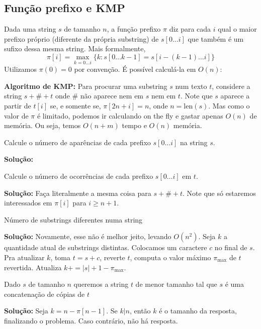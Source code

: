 \subsection{Função prefixo e KMP}

Dada uma string $s$ de tamanho $n$, a função prefixo $\pi$ diz para cada $i$ qual o maior prefixo próprio (diferente da própria substring) de $s[0...i]$ que também é um sufixo dessa mesma string. Mais formalmente,
$$\pi[i] = \max\limits_{k=0 \dots i} \{k : s[0 \dots k-1] = s[i - (k-1) \dots i] \}$$
Utilizamos $\pi(0) = 0$ por convenção. É possível calculá-la em $O(n)$:


\textbf{Algoritmo de KMP:} Para procurar uma substring $s$ num texto $t$, considere a string $s + \# + t$ onde $\#$ não aparece nem em $s$ nem em $t$. Note que $s$ aparece a partir de $t[i]$ se, e somente se, $\pi[2n+i] = n$, onde $n = \text{len}(s)$. Mas como o valor de $\pi$ é limitado, podemos ir calculando on the fly e gastar apenas $O(n)$ de memória. Ou seja, temos $O(n+m)$ tempo e $O(n)$ memória.

 Calcule o número de aparências de cada prefixo $s[0 \dots i]$ na string $s$.

\textbf{Solução:}


 Calcule o número de ocorrências de cada prefixo $s[0 \dots i]$ em $t$.

\textbf{Solução:} Faça literalmente a mesma coisa para $s + \# + t$. Note que só estaremos interessados em $\pi[i]$ para $i \geq n+1$.


 Número de substrings diferentes numa string

\textbf{Solução:} Novamente, esse não é melhor jeito, levando $O(n^2)$. Seja $k$ a quantidade atual de substrings distintas. Colocamos um caractere $c$ no final de $s$. Pra atualizar $k$, toma $t = s + c$, reverte $t$, computa o valor máximo $\pi_{\max}$ de $t$ revertida. Atualiza $k += |s| + 1 - \pi_{\max}$.

 Dado $s$ de tamanho $n$ queremos a string $t$ de menor tamanho tal que $s$ é uma concatenação de cópias de $t$

\textbf{Solução:} Seja $k = n - \pi[n-1]$. Se $k | n$, então $k$ é o tamanho da resposta, finalizando o problema. Caso contrário, não há resposta.


